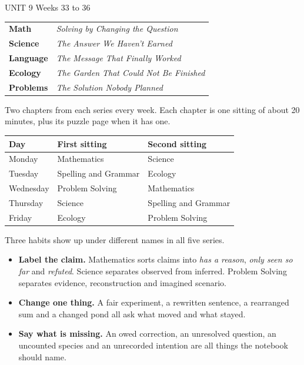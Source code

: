 \documentclass[10.5pt]{article}
\begin{document}
\begin{unitbox}{UNIT 9 \quad Weeks 33 to 36}
\begin{tabular}{@{}p{1.3in}p{2.5in}@{}}
\textcolor{hudorange}{\textbf{Math}} & \textit{Solving by Changing the Question}\\
\textcolor{hudorange}{\textbf{Science}} & \textit{The Answer We Haven't Earned}\\
\textcolor{hudorange}{\textbf{Language}} & \textit{The Message That Finally Worked}\\
\textcolor{hudorange}{\textbf{Ecology}} & \textit{The Garden That Could Not Be Finished}\\
\textcolor{hudorange}{\textbf{Problems}} & \textit{The Solution Nobody Planned}\\
\end{tabular}
\end{unitbox}

\newpage
{}

\begin{strategybox}
Two chapters from each series every week. Each chapter is one sitting of about 20 minutes, plus its puzzle page when it has one.
\end{strategybox}

\begin{center}\sffamily\small
\begin{tabular}{@{}lll@{}}
\toprule
\textbf{Day} & \textbf{First sitting} & \textbf{Second sitting}\\
\midrule
Monday & Mathematics & Science\\
Tuesday & Spelling and Grammar & Ecology\\
Wednesday & Problem Solving & Mathematics\\
Thursday & Science & Spelling and Grammar\\
Friday & Ecology & Problem Solving\\
\bottomrule
\end{tabular}
\end{center}

Three habits show up under different names in all five series.
\begin{itemize}
\item \textbf{Label the claim.} Mathematics sorts claims into \textit{has a reason}, \textit{only seen so far} and \textit{refuted}. Science separates observed from inferred. Problem Solving separates evidence, reconstruction and imagined scenario.
\item \textbf{Change one thing.} A fair experiment, a rewritten sentence, a rearranged sum and a changed pond all ask what moved and what stayed.
\item \textbf{Say what is missing.} An owed correction, an unresolved question, an uncounted species and an unrecorded intention are all things the notebook should name.
\end{itemize}
\end{document}
